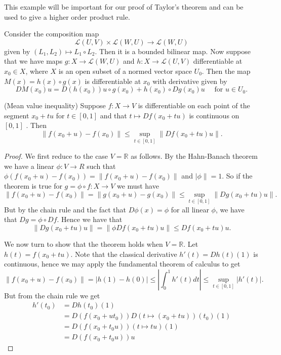 \documentclass[twoside, a4paper, 10pt]{amsart}
\begin{document}
This example will be important for our proof of Taylor's theorem and can be used to give a higher order product rule.
\begin{eg} \label{product rule for compositions} Consider the composition map $$ \mathcal{L}(U,V) \times \mathcal{L}(W, U)  \to \mathcal{L}(W,U)$$ given by $(L_1, L_2) \mapsto L_1 \circ L_2$. Then it is a bounded bilinear map. Now suppose that we have maps $g: X \to \mathcal{L}(W,U)$ and $h: X \to \mathcal{L}(U,V)$ differentiable at $x_0 \in X$, where $X$ is an open subset of a normed vector space $U_0$. Then the map $M(x) = h(x) \circ g(x)$ is differentiable at $x_0$ with derivative given by $$ DM(x_0)u = D(h(x_0))u \circ g(x_0) + h(x_0) \circ Dg(x_0)u \quad \text{ for } u \in U_0. $$ \end{eg}

\begin{lemma}(Mean value inequality) Suppose $f:X \to V$ is differentiable on each point of the segment $x_0 + tu$ for $t \in [0,1]$ and that $t \mapsto Df(x_0 + tu)$ is continuous on $[0,1]$ . Then $$\| f(x_0 + u) - f(x_0) \| \leq \sup_{t \in [0,1]} \| Df(x_0 + tu) u \|.$$ \end{lemma}

\begin{proof} We first reduce to the case $V = \mathbb{R}$ as follows. By the Hahn-Banach theorem we have a linear $\phi:V \to R$ such that $\phi (f(x_0 + u) - f(x_0)) = \| f(x_0 + u) - f(x_0) \|$ and $|\phi \| = 1$. So if the theorem is true for $g = \phi \circ f: X \to V$ we must have $$\|f(x_0+ u) -f(x_0)\| = \|g(x_0 + u) - g(x_0) \| \leq \sup_{t \in [0,1]} \| Dg(x_0 + tu) u \|.$$ But by the chain rule and the fact that $D\phi(x) = \phi$ for all linear $\phi$, we have that $Dg = \phi \circ Df$. Hence we have that $$\|Dg(x_0 +tu)u \| = \| \phi Df(x_0+tu)u \| \leq Df(x_0+tu)u.$$ 

We now turn to show that the theorem holds when $V = \mathbb{R}$. Let $h(t) = f(x_0+tu)$. Note that the classical derivative $h'(t) = Dh(t) (1)$ is continuous, hence we may apply the fundamental theorem of calculus to get $$\| f(x_0 + u) - f(x_0) \| = |h(1) - h(0)| \leq |\int_{0}^1 h'(t) dt| \leq \sup_{t \in [0,1]}|h'(t)|.$$ But from the chain rule we get
\begin{align*} h'(t_0) &= Dh(t_0)(1) \\ &= D(f(x_0 + ut_0)) D(t \mapsto (x_0 + tu))(t_0)(1) \\ &= D(f(x_0+t_0u)) (t \mapsto tu)(1) \\&=D(f(x_0+t_0u)) u  \end{align*} \end{proof}
\end{document}
